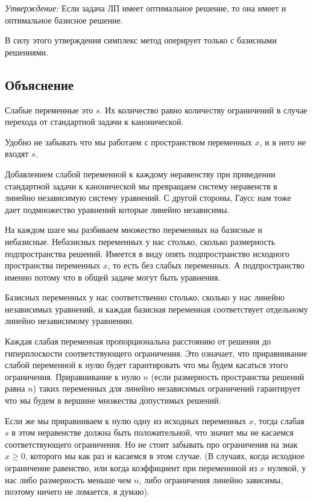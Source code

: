 \documentclass[a4paper,article,14pt]{extarticle}
\begin{document}
\textit{Утверждение:} Если задача ЛП имеет оптимальное решение, то она имеет и оптимальное базисное решение.

В силу этого утверждения симплекс метод оперирует только с базисными решениями.

\subsection{Объяснение}

Слабые переменные это \(s\).
Их количество равно количеству ограничений в случае перехода от стандартной задачи к канонической.

Удобно не забывать что мы работаем с пространством переменных \(x\), и в него не входят \(s\).

Добавлением слабой переменной к каждому неравенству при приведении стандартной задачи к канонической мы превращаем систему неравенств в линейно независимую систему уравнений.
С другой стороны, Гаусс нам тоже дает подмножество уравнений которые линейно независимы.

На каждом шаге мы разбиваем множество переменных на базисные и небазисные.
Небазисных переменных у нас столько, сколько размерность подпространства решений.
Имеется в виду опять подпространство исходного пространства переменных \(x\), то есть без слабых переменных.
А подпространство именно потому что в общей задаче могут быть уравнения.

Базисных переменных у нас соответственно столько, сколько у нас линейно независимых уравнений, и каждая базисная переменная соответствует отдельному линейно независимому уравнению.

Каждая слабая переменная пропорциональна расстоянию от решения до гиперплоскости соответствующего ограничения.
Это означает, что приравнивание слабой переменной к нулю будет гарантировать что мы будем касаться этого ограничения.
Приравнивание к нулю \(n\) (если размерность пространства решений равна \(n\)) таких переменных для линейно независимых ограничений гарантирует что мы будем в вершине множества допустимых решений.

Если же мы приравниваем к нулю одну из исходных переменных \(x\), тогда слабая \(s\) в этом неравенстве должна быть положительной, что значит мы не касаемся соответствующего ограничения.
Но не стоит забывать про ограничения на знак \(x \ge 0\), которого мы как раз и касаемся в этом случае. (В случаях, когда исходное ограничение равенство, или когда коэффициент при переменнной из \(x\) нулевой, у нас либо размерность меньше чем \(n\), либо ограничения линейно зависимы, поэтому ничего не ломается, я думаю).
\end{document}
